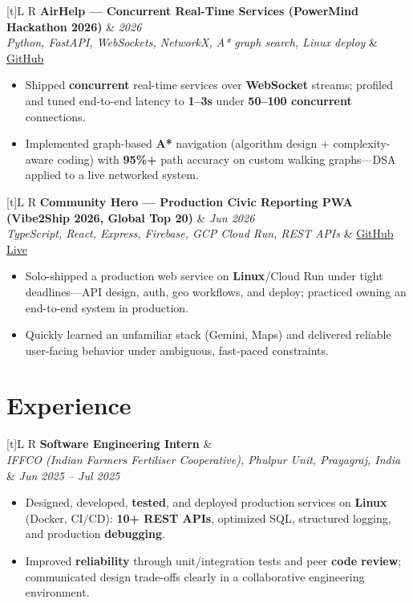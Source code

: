 \documentclass[a4paper,10pt]{article}
\newcommand{\resumeSubheading}[4]{%
  \vspace{0.4mm}
  \noindent
  \begin{tabularx}{\textwidth}[t]{L R}
    \textbf{#1} & #4 \\
    \textit{#3} & \textit{#2} \\
  \end{tabularx}
  \vspace{-0.4mm}%
}
\newcommand{\resumeProject}[4]{%
  \vspace{0.4mm}
  \noindent
  \begin{tabularx}{\textwidth}[t]{L R}
    \textbf{#1} & \textit{#3} \\
    \textit{#2} & #4 \\
  \end{tabularx}
  \vspace{-0.4mm}%
}
\begin{document}
\resumeProject
  {AirHelp --- Concurrent Real-Time Services (PowerMind Hackathon 2026)}
  {Python, FastAPI, WebSockets, NetworkX, A* graph search, Linux deploy}
  {2026}
  {\href{https://github.com/Ojas-Srivastava05/AirHelp-AI-Airport-Assistant}{GitHub}}
\begin{itemize}
  \item Shipped \textbf{concurrent} real-time services over \textbf{WebSocket} streams; profiled and tuned end-to-end latency to \textbf{1--3s} under \textbf{50--100 concurrent} connections.
  \item Implemented graph-based \textbf{A*} navigation (algorithm design + complexity-aware coding) with \textbf{95\%+} path accuracy on custom walking graphs---DSA applied to a live networked system.
\end{itemize}

\resumeProject
  {Community Hero --- Production Civic Reporting PWA (Vibe2Ship 2026, Global Top 20)}
  {TypeScript, React, Express, Firebase, GCP Cloud Run, REST APIs}
  {Jun 2026}
  {\href{https://github.com/Ojas-Srivastava05/community-hero}{GitHub} \textbar{} \href{https://community-hero-987477089222.asia-south1.run.app}{Live}}
\begin{itemize}
  \item Solo-shipped a production web service on \textbf{Linux}/Cloud Run under tight deadlines---API design, auth, geo workflows, and deploy; practiced owning an end-to-end system in production.
  \item Quickly learned an unfamiliar stack (Gemini, Maps) and delivered reliable user-facing behavior under ambiguous, fast-paced constraints.
\end{itemize}

\section{Experience}
\small
\resumeSubheading
  {Software Engineering Intern}{Jun 2025 -- Jul 2025}
  {IFFCO (Indian Farmers Fertiliser Cooperative), Phulpur Unit, Prayagraj, India}{}
\begin{itemize}
  \item Designed, developed, \textbf{tested}, and deployed production services on \textbf{Linux} (Docker, CI/CD): \textbf{10+ REST APIs}, optimized SQL, structured logging, and production \textbf{debugging}.
  \item Improved \textbf{reliability} through unit/integration tests and peer \textbf{code review}; communicated design trade-offs clearly in a collaborative engineering environment.
\end{itemize}
\end{document}
